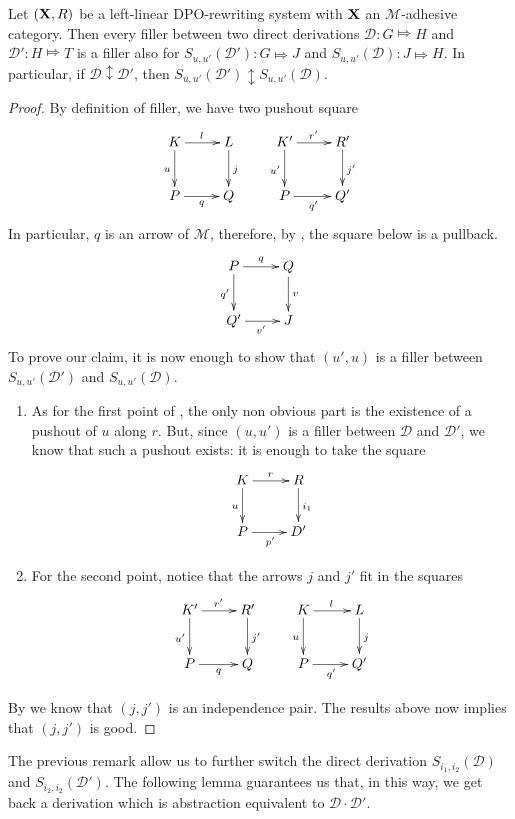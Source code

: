 \documentclass[a4paper,UKenglish,cleveref,pdftex, thm-restate,numberwithinsect]{lipics}
\def\R{\mathsf{R}}
\def\X{\textbf {\textup{X}}}
\renewcommand{\P}{\textbf {\textup{P}}}
\newcommand{\dder}[1]{\mathscr{#1}}
\begin{document}
\begin{theorem}\label{prop:fil}Let $(\X, \R)$ be a left-linear DPO-rewriting system with $\X$ an $\mathcal{M}$-adhesive category. Then every filler between two direct derivations $\dder{D}\colon G\Mapsto H$ and $\dder{D}'\colon H\Mapsto T$ is a filler also for $S_{u,u'}(\dder{D'})\colon G\Mapsto J$ and $S_{u,u'}(\dder{D})\colon J\Mapsto H$. In particular, if $\dder{D}\updownarrow \dder{D}'$, then $S_{u,u'}(\dder{D}')\updownarrow S_{u,u'}(\dder{D})$.
\end{theorem}
\begin{proof}By definition of filler, we have two pushout square
		\[\xymatrix{K \ar[r]^{l} \ar[d]_{u}& L \ar[d]^{j} & K' \ar[r]^{r'} \ar[d]_{u'} & R' \ar[d]^{j'}\\ P \ar[r]_q & Q & P \ar[r]_{q'} & Q'}\]
		In particular, $q$ is an arrow of $\mathcal{M}$, therefore, by , the square below is a pullback.
		\[\xymatrix{P \ar[r]^{q} \ar[d]_{q'}& Q\ar[d]^{v}\\ Q' \ar[r]_{v'} & J}\]
		To prove our claim, it is now enough to show that $(u',u)$ is a filler between $S_{u,u'}(\dder{D}')$ and $S_{u, u'}(\dder{D})$.
		\begin{enumerate}
			\item As for the first  point of , the only non obvious part is the existence of a pushout of $u$ along $r$. But, since $(u,u')$ is a filler between $\dder{D}$ and $\dder{D'}$, we know that such a pushout exists: it is enough to take the square
			\[\xymatrix{K \ar[r]^{r} \ar[d]_{u}& R \ar[d]^{i_1} \\P \ar[r]_{p'}& D'}\]
			\item For the second point, notice that the arrows $j$ and $j'$ fit in the squares
	\[\xymatrix{K' \ar[r]^{r'} \ar[d]_{u'}& R' \ar[d]^{j'} &K \ar[r]^{l} \ar[d]_{u}& L\ar[d]^{j} \\P \ar[r]_{q}& Q& P \ar[r]_{q'} & Q'}\] 
		\end{enumerate}
		
By  we know that $(j,j')$ is an independence pair. The results above now implies that $(j,j')$ is good.
\end{proof}

The previous remark allow us to further switch the direct derivation $S_{i_1,i_2}(\dder{D})$ and $S_{i_2,i_2}(\dder{D}')$. The following lemma guarantees us that, in this way, we get back a derivation which is abstraction equivalent to $\dder{D}\cdot \dder{D}'$.
\end{document}
